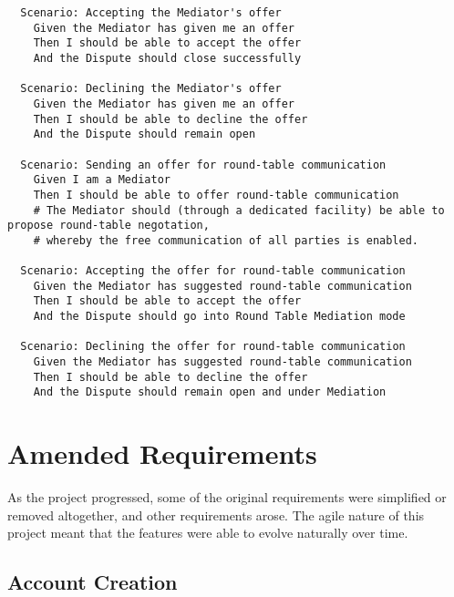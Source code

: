 \begin{lstlisting}
  Scenario: Accepting the Mediator's offer
    Given the Mediator has given me an offer
    Then I should be able to accept the offer
    And the Dispute should close successfully

  Scenario: Declining the Mediator's offer
    Given the Mediator has given me an offer
    Then I should be able to decline the offer
    And the Dispute should remain open

  Scenario: Sending an offer for round-table communication
    Given I am a Mediator
    Then I should be able to offer round-table communication
    # The Mediator should (through a dedicated facility) be able to propose round-table negotation,
    # whereby the free communication of all parties is enabled.

  Scenario: Accepting the offer for round-table communication
    Given the Mediator has suggested round-table communication
    Then I should be able to accept the offer
    And the Dispute should go into Round Table Mediation mode

  Scenario: Declining the offer for round-table communication
    Given the Mediator has suggested round-table communication
    Then I should be able to decline the offer
    And the Dispute should remain open and under Mediation
\end{lstlisting}

\section{Amended Requirements}

As the project progressed, some of the original requirements were simplified or removed altogether, and other requirements arose. The agile nature of this project meant that the features were able to evolve naturally over time.

\subsection{Account Creation}

